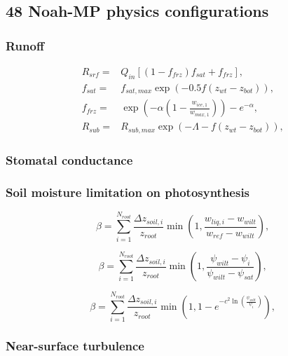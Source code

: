 \documentclass[essd]{copernicus}
\begin{document}
\subsection{48 Noah-MP physics configurations} \label{sec:data:noahmp}

\subsubsection{Runoff}

\begin{align}
    R_{srf} = & Q_{in} [(1 - f_{frz}) f_{sat} + f_{frz} ] \text{,}                                  \\
    f_{sat} = & f_{sat,max} \exp(-0.5 f (z_{wt} - z_{bot})) \text{,}                                \\
    f_{frz} = & \exp\left(-\alpha(1 - \frac{w_{ice,1}}{w_{max,1}})\right) - e^{-\alpha} \text{,} \\
    R_{sub} = & R_{sub,max} \exp\left( -\Lambda - f(z_{wt} - z_{bot}) \right) \text{,}
\end{align}

\subsubsection{Stomatal conductance}

\subsubsection{Soil moisture limitation on photosynthesis}

\begin{equation}
    \beta = \sum_{i=1}^{N_{root}} \frac{\Delta z_{soil,i}}{z_{root}}
    \min\left(1, \frac{w_{liq,i} - w_{wilt}}{w_{ref} - w_{wilt}}\right)
    \text{,}
\end{equation}

\begin{equation}
    \beta = \sum_{i=1}^{N_{root}} \frac{\Delta z_{soil,i}}{z_{root}}
    \min\left(1, \frac{\psi_{wilt} - \psi_{i}}{\psi_{wilt} - \psi_{sat}}\right)
    \text{,}
\end{equation}

\begin{equation}
    \beta = \sum_{i=1}^{N_{root}} \frac{\Delta z_{soil,i}}{z_{root}}
    \min\left(1, 1 - e^{-c^2 \ln\left(\frac{\psi_{wilt}}{\psi_{i}} \right)} \right)
    \text{,}
\end{equation}

\subsubsection{Near-surface turbulence}
\end{document}
